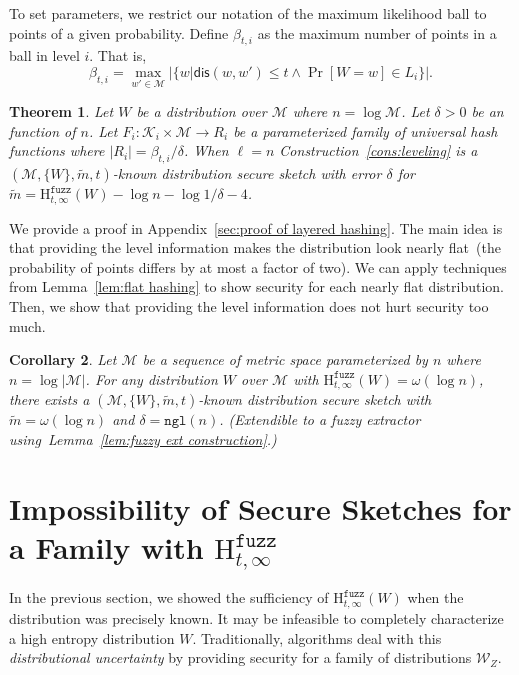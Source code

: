 \documentclass[11pt]{article}
\newtheorem{theorem}{Theorem}[section]
\newtheorem{corollary}[theorem]{Corollary}
\newcommand{\apref}[1]{\mbox{Appendix~\ref{#1}}}
\newcommand{\lemref}[1]{\mbox{Lemma~\ref{#1}}}
\newcommand{\consref}[1]{\mbox{Construction~\ref{#1}}}
\newcommand{\dis}{\ensuremath{\mathsf{dis}}}
\newcommand{\ngl}{\ensuremath{\mathtt{ngl}}\xspace}
\newcommand{\Hfuzz}{\mathrm{H}^{\mathtt{fuzz}}_{t,\infty}}
\newcommand{\M}{\mathcal{M}}
\begin{document}
\noindent
To set parameters, we restrict our notation of the maximum likelihood ball to points of a given probability.  Define $\beta_{t,i}$ as the maximum number of points in a ball in level $i$.  That is,
\[
\beta_{t,i} = \max_{w' \in \mathcal{M}} \left|\{w | \dis(w, w')\le t \wedge \Pr[W=w]\in L_i\}\right|.
\]

\begin{theorem}
\label{thm:layered hashing}
Let $W$ be a distribution over $\mathcal{M}$ where $n =\log \M$.  Let $\delta>0$ be an function of $n$.  Let $F_i: \mathcal{K}_i \times \mathcal{M}\rightarrow R_i$ be a parameterized family of universal hash functions where $|R_i| = \beta_{t,i} /\delta$.  When $\ell = n$ \consref{cons:leveling} is a $(\mathcal{M}, \{W\}, \tilde{m}, t)$-known distribution secure sketch with error $\delta$ for $\tilde{m} = \Hfuzz(W) - \log n - \log 1/\delta - 4$.

\end{theorem}
\noindent
We provide a proof in \apref{sec:proof of layered hashing}.  The main idea is that providing the level information makes the distribution look nearly flat~(the probability of points differs by at most a factor of two).  We can apply  techniques from \lemref{lem:flat hashing} to show security for each nearly flat distribution. Then, we show that providing the level information does not hurt security too much.

\begin{corollary}
\label{cor:extension to fuzz ext}
Let $\mathcal{M}$ be a sequence of metric space parameterized by $n$ where $n = \log |\M|$.
For any distribution $W$ over $\mathcal{M}$ with $\Hfuzz(W)=\omega(\log n)$, there exists a $(\mathcal{M}, \{W\}, \tilde{m}, t)$-known distribution secure sketch with $\tilde{m} = \omega(\log n)$ and $\delta = \ngl(n)$.  (Extendible to a fuzzy extractor using~\lemref{lem:fuzzy ext construction}.)
\end{corollary}

\section{Impossibility of Secure Sketches for a Family with $\Hfuzz$}
\label{sec:family of dist}

In the previous section, we showed the sufficiency of $\Hfuzz(W)$ when the distribution was precisely known.  It may be infeasible to completely characterize a high entropy distribution $W$.  Traditionally, algorithms deal with this \emph{distributional uncertainty} by providing security for a family of distributions $\mathcal{W}_Z$.  
\end{document}
